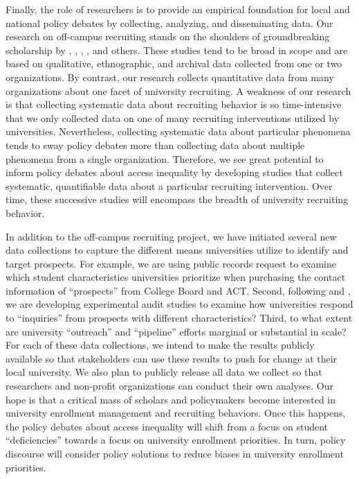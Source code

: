 \documentclass[twoside]{article}
\begin{document}
Finally, the role of researchers is to provide an empirical foundation for local and national policy debates by collecting, analyzing, and disseminating data.  Our research on off-campus recruiting stands on the shoulders of groundbreaking scholarship by \cite{RN1100}, \cite{RN3519}, \cite{RN4407}, \cite{RN4324}, and others.  These studies tend to be broad in scope and are based on qualitative, ethnographic, and archival data collected from one or two organizations. By contrast, our research collects quantitative data from many organizations about one facet of university recruiting. A weakness of our research is that collecting systematic data about recruiting behavior is so time-intensive that we only collected data on one of many recruiting interventions utilized by universities. Nevertheless, collecting systematic data about particular phenomena tends to sway policy debates more than collecting data about multiple phenomena from a single organization. Therefore, we see great potential to inform policy debates about access inequality by developing studies that collect systematic, quantifiable data about a particular recruiting intervention. Over time, these successive studies will encompass the breadth of university recruiting behavior.  

In addition to the off-campus recruiting project, we have initiated several new data collections to capture the different means universities utilize to identify and target prospects.  For example, we are using public records request to examine which student characteristics universities prioritize when purchasing the contact information of ``prospects'' from College Board and ACT.  Second, following \cite{RN4331} and \cite{RN4360}, we are developing experimental audit studies to examine how universities respond to ``inquiries'' from prospects with different characteristics? Third, to what extent are university ``outreach'' and ``pipeline'' efforts marginal or substantial in scale? For each of these data collections, we intend to make the results publicly available so that stakeholders can use these results to push for change at their local university. We also plan to publicly release all data we collect so that researchers and non-profit organizations can conduct their own analyses.  Our hope is that a critical mass of scholars and policymakers become interested in university enrollment management and recruiting behaviors.  Once this happens, the policy debates about access inequality will shift from a focus on student ``deficiencies'' towards a focus on university enrollment priorities.  In turn, policy discourse will consider policy solutions to reduce biases in university enrollment priorities.
\end{document}

